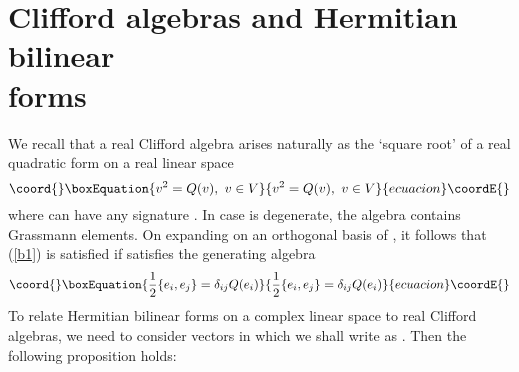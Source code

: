 \documentclass[a4paper,a4paper]{article}
\begin{document}
\section{Clifford algebras and Hermitian bilinear\\forms}
We recall that a real Clifford algebra arises naturally as the `square root' of
a real quadratic form \coordHE{} on a real linear space \coordHE{} 
\begin{equation}\coord{}\boxEquation{ 
v^{2}=Q(v) , \  v \in  V 
\label{b1} 
}{ 
v^{2}=Q(v) , \  v \in  V 
}{ecuacion}\coordE{}\end{equation} 
where \coordHE{} can have any signature \coordHE{}. In case \coordHE{} is degenerate, the algebra
contains Grassmann elements. On expanding \coordHE{} on an orthogonal basis \coordHE{} of
\coordHE{}, it follows that (\ref{b1}) is satisfied if \coordHE{} satisfies the generating
algebra
\begin{equation}\coord{}\boxEquation{ 
\frac{1}{2}\{e_{i},e_{j}\} = \delta _{ij}Q(e_{i})
\label{b2} 
}{ 
\frac{1}{2}\{e_{i},e_{j}\} = \delta _{ij}Q(e_{i})
}{ecuacion}\coordE{}\end{equation} 
To relate Hermitian bilinear forms on a complex linear space \coordHE{} to real
Clifford algebras, we need to consider vectors in \coordHE{} which we shall
write as \coordHE{}. Then the following
proposition holds:
\end{document}
